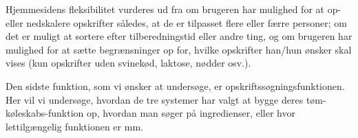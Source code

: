 Hjemmesidens fleksibilitet vurderes ud fra om brugeren har mulighed for \fx at op- eller nedskalere opskrifter således, at de er tilpasset flere eller færre personer; om det er muligt at sortere efter tilberedningstid eller andre ting, og om brugeren har mulighed for at sætte begrænsninger op for, hvilke opskrifter han/hun ønsker skal vises (\fx kun opskrifter uden svinekød, laktose, nødder osv.). 

Den sidste funktion, som vi ønsker at undersøge, er opskriftssøgningsfunktionen. Her vil vi undersøge, hvordan de tre systemer har valgt at bygge deres tøm-køleskabs-funktion op, \fx hvordan man søger på ingredienser, eller hvor lettilgængelig funktionen er mm.





